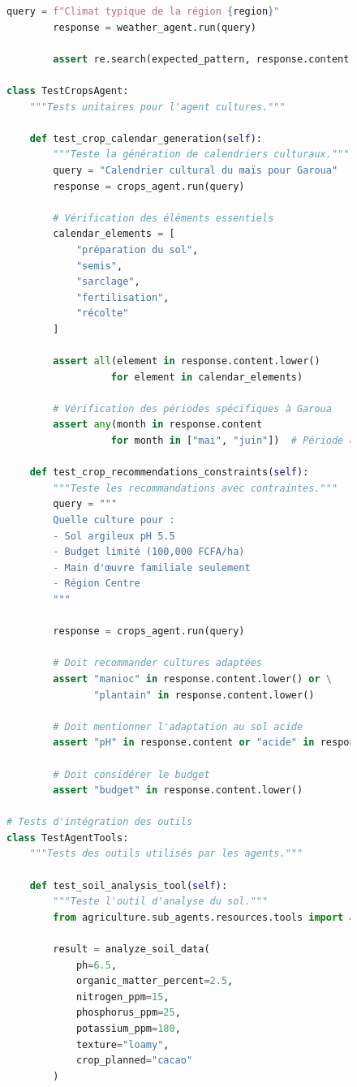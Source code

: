 \begin{figure}[H]
\begin{lstlisting}[language=Python, caption=Framework de tests unitaires pour agents ADK]
        query = f"Climat typique de la région {region}"
        response = weather_agent.run(query)

        assert re.search(expected_pattern, response.content, re.IGNORECASE)

class TestCropsAgent:
    """Tests unitaires pour l'agent cultures."""

    def test_crop_calendar_generation(self):
        """Teste la génération de calendriers culturaux."""
        query = "Calendrier cultural du maïs pour Garoua"
        response = crops_agent.run(query)

        # Vérification des éléments essentiels
        calendar_elements = [
            "préparation du sol",
            "semis",
            "sarclage",
            "fertilisation",
            "récolte"
        ]

        assert all(element in response.content.lower()
                  for element in calendar_elements)

        # Vérification des périodes spécifiques à Garoua
        assert any(month in response.content
                  for month in ["mai", "juin"])  # Période de semis

    def test_crop_recommendations_constraints(self):
        """Teste les recommandations avec contraintes."""
        query = """
        Quelle culture pour :
        - Sol argileux pH 5.5
        - Budget limité (100,000 FCFA/ha)
        - Main d'œuvre familiale seulement
        - Région Centre
        """

        response = crops_agent.run(query)

        # Doit recommander cultures adaptées
        assert "manioc" in response.content.lower() or \
               "plantain" in response.content.lower()

        # Doit mentionner l'adaptation au sol acide
        assert "pH" in response.content or "acide" in response.content

        # Doit considérer le budget
        assert "budget" in response.content.lower()

# Tests d'intégration des outils
class TestAgentTools:
    """Tests des outils utilisés par les agents."""

    def test_soil_analysis_tool(self):
        """Teste l'outil d'analyse du sol."""
        from agriculture.sub_agents.resources.tools import analyze_soil_data

        result = analyze_soil_data(
            ph=6.5,
            organic_matter_percent=2.5,
            nitrogen_ppm=15,
            phosphorus_ppm=25,
            potassium_ppm=180,
            texture="loamy",
            crop_planned="cacao"
        )


\end{lstlisting}
\end{figure}
